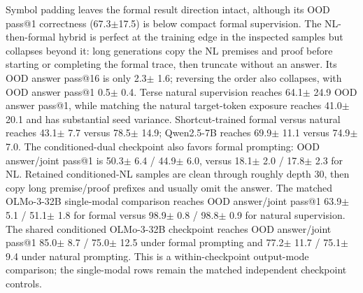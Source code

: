 \documentclass[10pt]{article}
\begin{document}
Symbol padding leaves the formal result direction intact, although its OOD pass@1 correctness
(67.3$\pm$17.5)
is below compact formal supervision. The NL-then-formal hybrid is perfect at the training edge in
the inspected samples but collapses beyond it: long generations copy the NL premises and proof
before starting or completing the formal trace, then truncate without an answer. Its OOD answer
pass@16 is only 2.3$\pm$
1.6; reversing the order also collapses, with OOD
answer pass@1 0.5$\pm$
0.4. Terse natural supervision reaches
64.1$\pm$
24.9 OOD answer pass@1, while matching the natural
target-token exposure reaches 41.0$\pm$
20.1 and has substantial seed variance.
Shortcut-trained formal versus natural reaches
43.1$\pm$
7.7 versus
78.5$\pm$
14.9; Qwen2.5-7B reaches
69.9$\pm$
11.1 versus
74.9$\pm$
7.0. The conditioned-dual checkpoint also favors formal
prompting: OOD answer/joint pass@1 is
50.3$\pm$
6.4 /
44.9$\pm$
6.0, versus
18.1$\pm$
2.0 /
17.8$\pm$
2.3 for NL. Retained conditioned-NL samples are
clean through roughly depth 30, then copy long premise/proof prefixes and usually omit the answer.
The matched OLMo-3-32B single-modal comparison reaches OOD answer/joint pass@1
63.9$\pm$
5.1 /
51.1$\pm$
1.8 for formal versus
98.9$\pm$
0.8 /
98.8$\pm$
0.9 for natural supervision. The shared conditioned
OLMo-3-32B checkpoint reaches OOD answer/joint pass@1
85.0$\pm$
8.7 /
75.0$\pm$
12.5 under formal prompting and
77.2$\pm$
11.7 /
75.1$\pm$
9.4 under natural prompting. This is a
within-checkpoint output-mode comparison; the single-modal rows remain the matched independent
checkpoint controls.
\end{document}
